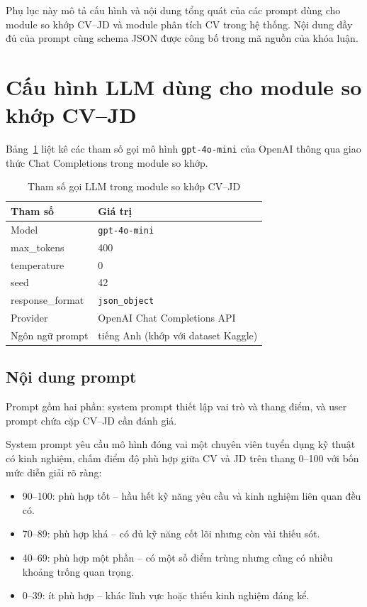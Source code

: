 \documentclass[../DoAn.tex]{subfiles}
\begin{document}
Phụ lục này mô tả cấu hình và nội dung tổng quát của các prompt dùng cho module so khớp CV--JD và module phân tích CV trong hệ thống. Nội dung đầy đủ của prompt cùng schema JSON được công bố trong mã nguồn của khóa luận.

\section{Cấu hình LLM dùng cho module so khớp CV--JD}

Bảng~\ref{tab:llm-config-ch5} liệt kê các tham số gọi mô hình \texttt{gpt-4o-mini} của OpenAI thông qua giao thức Chat Completions trong module so khớp.

\begin{table}[H]
\centering
\caption{Tham số gọi LLM trong module so khớp CV--JD}
\label{tab:llm-config-ch5}
\begin{tabular}{|l|l|}
\hline
\textbf{Tham số} & \textbf{Giá trị} \\
\hline
Model & \texttt{gpt-4o-mini} \\
\hline
max\_tokens & 400 \\
\hline
temperature & 0 \\
\hline
seed & 42 \\
\hline
response\_format & \texttt{json\_object} \\
\hline
Provider & OpenAI Chat Completions API \\
\hline
Ngôn ngữ prompt & tiếng Anh (khớp với dataset Kaggle) \\
\hline
\end{tabular}
\end{table}

\subsection{Nội dung prompt}

Prompt gồm hai phần: system prompt thiết lập vai trò và thang điểm, và user prompt chứa cặp CV–JD cần đánh giá.

System prompt yêu cầu mô hình đóng vai một chuyên viên tuyển dụng kỹ thuật có kinh nghiệm, chấm điểm độ phù hợp giữa CV và JD trên thang 0–100 với bốn mức diễn giải rõ ràng:

\begin{itemize}
\item 90--100: phù hợp tốt -- hầu hết kỹ năng yêu cầu và kinh nghiệm liên quan đều có.
\item 70--89: phù hợp khá -- có đủ kỹ năng cốt lõi nhưng còn vài thiếu sót.
\item 40--69: phù hợp một phần -- có một số điểm trùng nhưng cũng có nhiều khoảng trống quan trọng.
\item 0--39: ít phù hợp -- khác lĩnh vực hoặc thiếu kinh nghiệm đáng kể.
\end{itemize}
\end{document}
